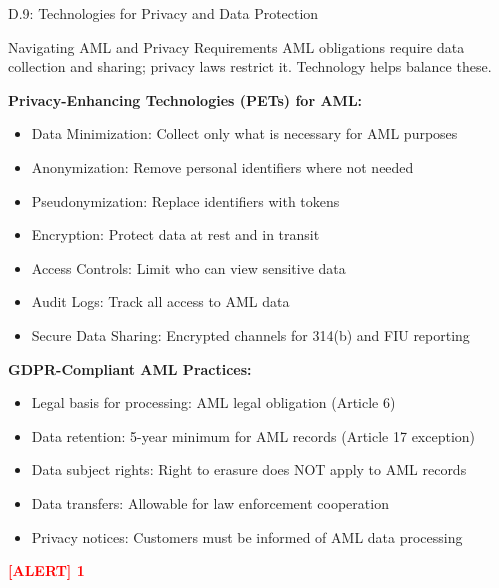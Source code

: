 \documentclass[11pt,a4paper]{beamer}
\newcommand{\redflag}[1]{\textcolor{red}{\textbf{[ALERT] 1}}}
\begin{document}
\begin{frame}{D.9: Technologies for Privacy and Data Protection}
	\begin{block}{Navigating AML and Privacy Requirements}
		AML obligations require data collection and sharing; privacy laws restrict it. Technology helps balance these.
	\end{block}
	\textbf{Privacy-Enhancing Technologies (PETs) for AML:}
	\begin{itemize}
		\item Data Minimization: Collect only what is necessary for AML purposes
		\item Anonymization: Remove personal identifiers where not needed
		\item Pseudonymization: Replace identifiers with tokens
		\item Encryption: Protect data at rest and in transit
		\item Access Controls: Limit who can view sensitive data
		\item Audit Logs: Track all access to AML data
		\item Secure Data Sharing: Encrypted channels for 314(b) and FIU reporting
	\end{itemize}
	\textbf{GDPR-Compliant AML Practices:}
	\begin{itemize}
		\item Legal basis for processing: AML legal obligation (Article 6)
		\item Data retention: 5-year minimum for AML records (Article 17 exception)
		\item Data subject rights: Right to erasure does NOT apply to AML records
		\item Data transfers: Allowable for law enforcement cooperation
		\item Privacy notices: Customers must be informed of AML data processing
	\end{itemize}
	\redflag{AML obligations override privacy rights for required data retention.}
\end{frame}
\end{document}
